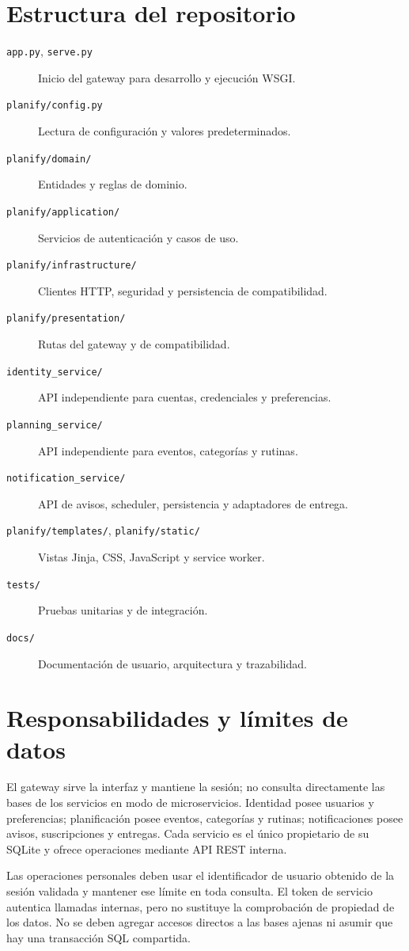 \documentclass[12pt,a4paper]{article}
\begin{document}
\section{Estructura del repositorio}
\begin{description}
  \item[\texttt{app.py}, \texttt{serve.py}] Inicio del gateway para desarrollo y ejecución WSGI.
  \item[\texttt{planify/config.py}] Lectura de configuración y valores predeterminados.
  \item[\texttt{planify/domain/}] Entidades y reglas de dominio.
  \item[\texttt{planify/application/}] Servicios de autenticación y casos de uso.
  \item[\texttt{planify/infrastructure/}] Clientes HTTP, seguridad y persistencia de compatibilidad.
  \item[\texttt{planify/presentation/}] Rutas del gateway y de compatibilidad.
  \item[\texttt{identity\_service/}] API independiente para cuentas, credenciales y preferencias.
  \item[\texttt{planning\_service/}] API independiente para eventos, categorías y rutinas.
  \item[\texttt{notification\_service/}] API de avisos, scheduler, persistencia y adaptadores de entrega.
  \item[\texttt{planify/templates/}, \texttt{planify/static/}] Vistas Jinja, CSS, JavaScript y service worker.
  \item[\texttt{tests/}] Pruebas unitarias y de integración.
  \item[\texttt{docs/}] Documentación de usuario, arquitectura y trazabilidad.
\end{description}

\section{Responsabilidades y límites de datos}
El gateway sirve la interfaz y mantiene la sesión; no consulta directamente las bases de los servicios en modo de microservicios. Identidad posee usuarios y preferencias; planificación posee eventos, categorías y rutinas; notificaciones posee avisos, suscripciones y entregas. Cada servicio es el único propietario de su SQLite y ofrece operaciones mediante API REST interna.

Las operaciones personales deben usar el identificador de usuario obtenido de la sesión validada y mantener ese límite en toda consulta. El token de servicio autentica llamadas internas, pero no sustituye la comprobación de propiedad de los datos. No se deben agregar accesos directos a las bases ajenas ni asumir que hay una transacción SQL compartida.
\end{document}
